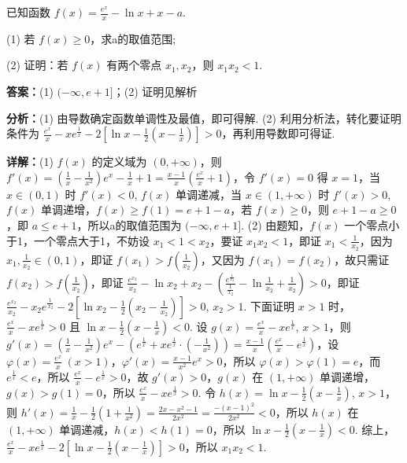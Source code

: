 \begin{question}[points=12]
已知函数 $f(x)=\frac{e^x}{x}-\ln x+x-a$.

(1) 若 $f(x)\geq 0$，求a的取值范围;

(2) 证明：若 $f(x)$ 有两个零点 $x_1, x_2$，则 $x_1x_2<1$.
\begin{solution}
\textbf{答案：}(1) $(-\infty, e+1]$；(2) 证明见解析

\textbf{分析：}(1) 由导数确定函数单调性及最值，即可得解. (2) 利用分析法，转化要证明条件为 $\frac{e^x}{x}-xe^{\frac{1}{x}}-2\left[\ln x-\frac{1}{2}\left(x-\frac{1}{x}\right)\right]>0$，再利用导数即可得证.

\textbf{详解：}(1) $f(x)$ 的定义域为 $(0,+\infty)$，则 $f'(x)=\left(\frac{1}{x}-\frac{1}{x^2}\right)e^x-\frac{1}{x}+1=\frac{x-1}{x}\left(\frac{e^x}{x}+1\right)$，令 $f'(x)=0$ 得 $x=1$，当 $x\in(0,1)$ 时 $f'(x)<0$, $f(x)$ 单调递减，当 $x\in(1,+\infty)$ 时 $f'(x)>0$, $f(x)$ 单调递增，$f(x)\geq f(1)=e+1-a$，若 $f(x)\geq0$，则 $e+1-a\geq0$，即 $a\leq e+1$，所以a的取值范围为 $(-\infty, e+1]$.
(2) 由题知，$f(x)$ 一个零点小于1，一个零点大于1，不妨设 $x_1<1<x_2$，要证 $x_1x_2<1$，即证 $x_1<\frac{1}{x_2}$，因为 $x_1,\frac{1}{x_2}\in(0,1)$，即证 $f(x_1)>f\left(\frac{1}{x_2}\right)$，又因为 $f(x_1)=f(x_2)$，故只需证 $f(x_2)>f\left(\frac{1}{x_2}\right)$，即证 $\frac{e^{x_2}}{x_2}-\ln x_2+x_2-\left(\frac{e^{\frac{1}{x_2}}}{\frac{1}{x_2}}-\ln\frac{1}{x_2}+\frac{1}{x_2}\right)>0$，即证 $\frac{e^{x_2}}{x_2}-x_2 e^{\frac{1}{x_2}}-2\left[\ln x_2-\frac{1}{2}\left(x_2-\frac{1}{x_2}\right)\right]>0$, $x_2>1$. 下面证明 $x>1$ 时，$\frac{e^x}{x}-xe^{\frac{1}{x}}>0$ 且 $\ln x-\frac{1}{2}\left(x-\frac{1}{x}\right)<0$. 设 $g(x)=\frac{e^x}{x}-xe^{\frac{1}{x}}$, $x>1$，则 $g'(x)=\left(\frac{1}{x}-\frac{1}{x^2}\right)e^x-\left(e^{\frac{1}{x}}+xe^{\frac{1}{x}}\cdot(-\frac{1}{x^2})\right)=\frac{x-1}{x}\left(\frac{e^x}{x}-e^{\frac{1}{x}}\right)$，设 $\varphi(x)=\frac{e^x}{x}\ (x>1)$，$\varphi'(x)=\frac{x-1}{x^2}e^x>0$，所以 $\varphi(x)>\varphi(1)=e$，而 $e^{\frac{1}{x}}<e$，所以 $\frac{e^x}{x}-e^{\frac{1}{x}}>0$，故 $g'(x)>0$，$g(x)$ 在 $(1,+\infty)$ 单调递增，$g(x)>g(1)=0$，所以 $\frac{e^x}{x}-xe^{\frac{1}{x}}>0$. 令 $h(x)=\ln x-\frac{1}{2}\left(x-\frac{1}{x}\right)$, $x>1$，则 $h'(x)=\frac{1}{x}-\frac{1}{2}\left(1+\frac{1}{x^2}\right)=\frac{2x-x^2-1}{2x^2}=\frac{-(x-1)^2}{2x^2}<0$，所以 $h(x)$ 在 $(1,+\infty)$ 单调递减，$h(x)<h(1)=0$，所以 $\ln x-\frac{1}{2}\left(x-\frac{1}{x}\right)<0$. 综上，$\frac{e^x}{x}-xe^{\frac{1}{x}}-2\left[\ln x-\frac{1}{2}\left(x-\frac{1}{x}\right)\right]>0$，所以 $x_1x_2<1$.
\end{solution}
\end{question}

